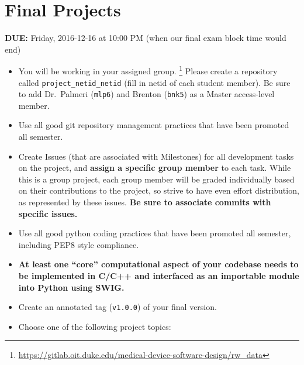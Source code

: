 


\section*{Final Projects}

{\bf DUE:} Friday, 2016-12-16 at 10:00 PM (when our final exam block time would end)

\begin{itemize}

    \item You will be working in your assigned group.
        \footnote{\url{https://gitlab.oit.duke.edu/medical-device-software-design/rw_data}}
        Please create a repository called \verb+project_netid_netid+ (fill
        in netid of each student member).  Be sure to add Dr.~Palmeri
        (\verb+mlp6+) and Brenton (\verb+bnk5+) as a Master access-level member.

    \item Use all good git repository management practices that have been promoted all semester.

    \item Create Issues (that are associated with Milestones) for all
        development tasks on the project, and \textbf{assign a specific group
        member} to each task.  While this is a group project, each group member
        will be graded individually based on their contributions to the
        project, so strive to have even effort distribution, as represented by
        these issues.  \textbf{Be sure to associate commits with specific issues.}

    \item Use all good python coding practices that have been promoted all
        semester, including PEP8 style compliance.

    \item \textbf{At least one ``core'' computational aspect of your codebase
        needs to be implemented in C/C++ and interfaced as an importable module
        into Python using SWIG.}

    \item Create an annotated tag (\verb+v1.0.0+) of your final version.

    \item Choose one of the following project topics:


\end{itemize}
